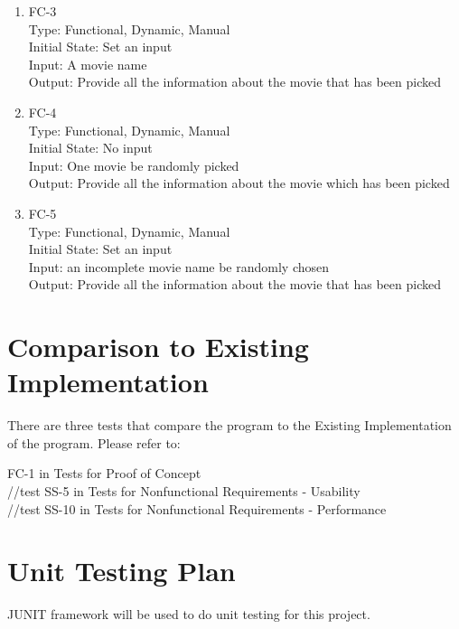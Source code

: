 \documentclass[12pt, titlepage]{article}
\begin{document}
\begin{enumerate}
\item{FC-3}\\
Type:  Functional, Dynamic, Manual\\
Initial State: Set an input\\
Input: A movie name \\
Output: Provide all the information about the movie that has been picked


\item{FC-4\\}
Type:  Functional, Dynamic, Manual\\
Initial State: No input \\
Input: One movie be randomly picked\\
Output: Provide all the information about the movie which has been picked

\item{FC-5\\}
Type:  Functional, Dynamic, Manual\\
Initial State: Set an input\\
Input: an incomplete movie name be randomly chosen\\
Output: Provide all the information about the movie that has been picked
\end{enumerate}

\section{Comparison to Existing Implementation}	
There are three tests that compare the program to the Existing Implementation of the program. Please refer to:

FC-1 in Tests for Proof of Concept\\
//test SS-5 in Tests for Nonfunctional Requirements - Usability\\
//test SS-10 in Tests for Nonfunctional Requirements - Performance\\

				
\section{Unit Testing Plan}
JUNIT framework will be used to do unit testing for this project.
		
\end{document}
